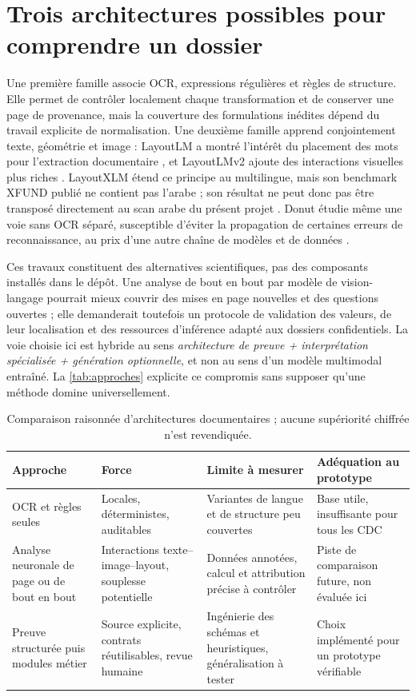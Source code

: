 \section{Trois architectures possibles pour comprendre un dossier}
Une première famille associe OCR, expressions régulières et règles de structure. Elle permet de contrôler localement chaque transformation et de conserver une page de provenance, mais la couverture des formulations inédites dépend du travail explicite de normalisation. Une deuxième famille apprend conjointement texte, géométrie et image : LayoutLM a montré l'intérêt du placement des mots pour l'extraction documentaire \cite{layoutlm}, et LayoutLMv2 ajoute des interactions visuelles plus riches \cite{layoutlmv2}. LayoutXLM étend ce principe au multilingue, mais son benchmark XFUND publié ne contient pas l'arabe ; son résultat ne peut donc pas être transposé directement au scan arabe du présent projet \cite{layoutxlm}. Donut étudie même une voie sans OCR séparé, susceptible d'éviter la propagation de certaines erreurs de reconnaissance, au prix d'une autre chaîne de modèles et de données \cite{donut}.

Ces travaux constituent des alternatives scientifiques, pas des composants installés dans le dépôt. Une analyse de bout en bout par modèle de vision-langage pourrait mieux couvrir des mises en page nouvelles et des questions ouvertes ; elle demanderait toutefois un protocole de validation des valeurs, de leur localisation et des ressources d'inférence adapté aux dossiers confidentiels. La voie choisie ici est hybride au sens \emph{architecture de preuve + interprétation spécialisée + génération optionnelle}, et non au sens d'un modèle multimodal entraîné. La \autoref{tab:approches} explicite ce compromis sans supposer qu'une méthode domine universellement.

\begin{table}[htbp]\centering\tighttable
\begin{tabularx}{\textwidth}{@{}p{30mm}Y Y Y@{}}\toprule
Approche & Force & Limite à mesurer & Adéquation au prototype\\\midrule
OCR et règles seules & Locales, déterministes, auditables & Variantes de langue et de structure peu couvertes & Base utile, insuffisante pour tous les CDC\\
Analyse neuronale de page ou de bout en bout & Interactions texte--image--layout, souplesse potentielle & Données annotées, calcul et attribution précise à contrôler & Piste de comparaison future, non évaluée ici\\
Preuve structurée puis modules métier & Source explicite, contrats réutilisables, revue humaine & Ingénierie des schémas et heuristiques, généralisation à tester & Choix implémenté pour un prototype vérifiable\\\bottomrule
\end{tabularx}
\caption{Comparaison raisonnée d'architectures documentaires ; aucune supériorité chiffrée n'est revendiquée.}\label{tab:approches}
\end{table}

